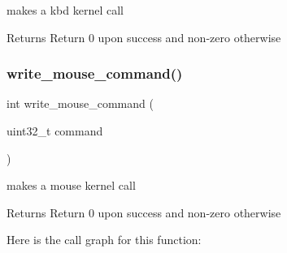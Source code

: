 makes a kbd kernel call 

\begin{DoxyReturn}{Returns}
Return 0 upon success and non-\/zero otherwise 
\end{DoxyReturn}
\mbox{\label{group__mouse_ga26d0989b9acaa8dea02b2f0639916c0e}} 
\subsubsection{\texorpdfstring{write\_mouse\_command()}{write\_mouse\_command()}}
{\footnotesize\ttfamily int write\+\_\+mouse\+\_\+command (\begin{DoxyParamCaption}\item[{uint32\+\_\+t}]{command }\end{DoxyParamCaption})}



makes a mouse kernel call 

\begin{DoxyReturn}{Returns}
Return 0 upon success and non-\/zero otherwise 
\end{DoxyReturn}
Here is the call graph for this function\+:

